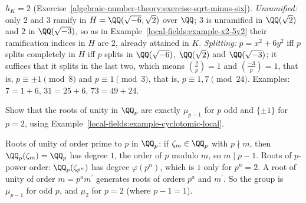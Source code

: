 \begin{solution}
$h_K = 2$ (Exercise~\ref{algebraic-number-theory:exercise-sqrt-minus-six}). \emph{Unramified:} only $2$ and $3$ ramify in $H = \QQ(\sqrt{-6}, \sqrt2)$ over $\QQ$; $3$ is unramified in $\QQ(\sqrt2)$ and $2$ in
$\QQ(\sqrt{-3})$, so as in Example~\ref{local-fields:example-x2-5y2} their ramification indices in $H$ are $2$, already attained in $K$. \emph{Splitting:} $p = x^2 + 6y^2$ iff $p$ splits completely in $H$ iff
$p$ splits in $\QQ(\sqrt{-6})$, $\QQ(\sqrt 2)$ and $\QQ(\sqrt{-3})$; it suffices that it splits in the last two, which means $(\frac2p) = 1$ and $(\frac{-3}{p}) = 1$, that is, $p \equiv \pm1 \pmod 8$ and
$p \equiv 1 \pmod 3$, that is, $p \equiv 1, 7 \pmod{24}$. Examples: $7 = 1 + 6$, $31 = 25 + 6$, $73 = 49 + 24$.
\end{solution}

\begin{exercise}\label{local-fields:exercise-roots-of-unity-qp}
Show that the roots of unity in $\QQ_p$ are exactly $\mu_{p-1}$ for $p$ odd and $\{\pm1\}$ for $p = 2$, using Example~\ref{local-fields:example-cyclotomic-local}.
\end{exercise}

\begin{solution}
Roots of unity of order prime to $p$ in $\QQ_p$: if $\zeta_m \in \QQ_p$ with $p \nmid m$, then $\QQ_p(\zeta_m) = \QQ_p$ has degree $1$, the order of $p$ modulo $m$, so $m \mid p - 1$. Roots of $p$-power
order: $\QQ_p(\zeta_{p^n})$ has degree $\varphi(p^n)$, which is $1$ only for $p^n = 2$. A root of unity of order $m = p^am^{\prime}$ generates roots of orders $p^a$ and $m^{\prime}$. So the group is $\mu_{p-1}$ for odd
$p$, and $\mu_2$ for $p = 2$ (where $p - 1 = 1$).
\end{solution}
